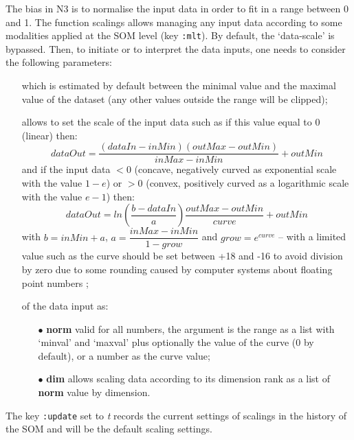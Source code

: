 The bias in N3 is to normalise the input data in order to fit in a range between 0 and 1. The function \glspl{scaling} allows managing any input data according to some modalities applied at the SOM level (key \texttt{:mlt}). By default, the `data-scale' is bypassed. Then, to initiate or to interpret the data inputs, one needs to consider the following parameters:
\begin{itemize}
\item[]  which is estimated by default between the minimal value and the maximal value of the dataset (any other values outside the range will be clipped);
\item[]  allows to set the scale of the input data such as if this value equal to 0 (linear) then: 
$$dataOut=\frac{(dataIn-inMin)(outMax-outMin)}{inMax-inMin}+outMin$$
and if the input data $< 0$ (concave, negatively curved as exponential scale with the value $1-e$) or $> 0$ (convex, positively curved as a logarithmic scale with the value $e-1$) then:
$$dataOut=ln\left(\dfrac{b-dataIn}{a}\right)\dfrac{outMax-outMin}{curve}+outMin$$
with $b=inMin+a$,  $a=\dfrac{inMax-inMin}{1-grow}$ and $grow=e^{curve}$ -- with a limited value such as the curve should be set between +18 and -16 to avoid division by zero due to some rounding caused by computer systems about floating point numbers \citep{re};
\item[]  of the data input as:
\begin{itemize}
\item[$\bullet$] \textbf{norm} valid for all numbers, the argument is the range as a list with `minval' and `maxval' plus optionally the value of the curve (0 by default), or a number as the curve value; %
\item[$\bullet$] \textbf{dim} allows scaling data according to its dimension rank as a list of \textbf{norm} value by dimension.
\end{itemize}
\end{itemize}
The key \texttt{:update} set to \textit{t} records the current settings of \glspl{scaling} in the history of the SOM and will be the default scaling settings. 

